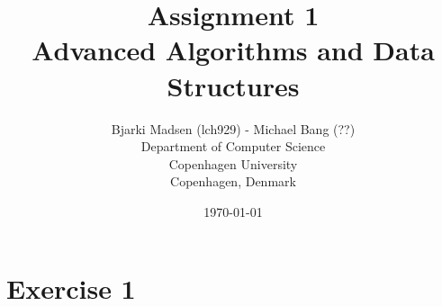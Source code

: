 \documentclass[12pt]{article}
\newcommand{\assignmentname}{Assignment 1}
\newcommand{\coursename}{Advanced Algorithms and Data Structures}
\newcommand{\studentname}{Bjarki Madsen (lch929) - Michael Bang (??)}
\newcommand{\department}{Department of Computer Science}
\newcommand{\institution}{Copenhagen University}
\newcommand{\location}{Copenhagen, Denmark}
\begin{document}
\renewcommand\refname{References}

\title{\assignmentname \\ {\Large {\textsc \coursename}}}
\author{
        \studentname \\
        \department \\
        \institution \\
        \location
}
\date{\today}

\maketitle
\thispagestyle{empty}

\pagebreak

\section*{Exercise 1}
\end{document}
